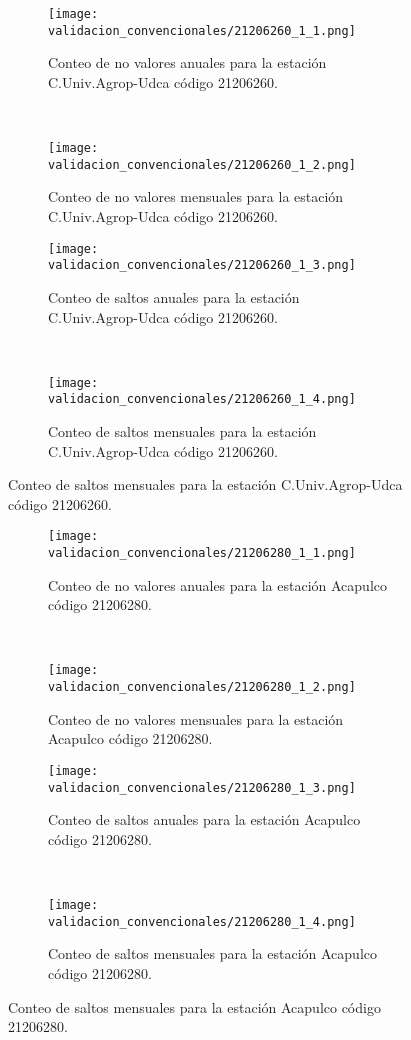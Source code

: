 \begin{figure}[H]\ContinuedFloat
\centering
	\begin{subfigure}[normla]{0.4\textwidth}
	\texttt{[image: validacion\_convencionales/21206260\_1\_1.png]}
		\caption{Conteo de no valores anuales para la estación C.Univ.Agrop-Udca código 21206260.}
		\label{subfig:a1}
		\end{subfigure}
		~
    \begin{subfigure}[normla]{0.4\textwidth}
	\texttt{[image: validacion\_convencionales/21206260\_1\_2.png]}
		\caption{Conteo de no valores mensuales para la estación C.Univ.Agrop-Udca código 21206260.}
		\label{subfig:a2}
		\end{subfigure}
		
    \begin{subfigure}[normla]{0.4\textwidth}
	\texttt{[image: validacion\_convencionales/21206260\_1\_3.png]}
		\caption{Conteo de saltos anuales para la estación C.Univ.Agrop-Udca código 21206260.}
		\label{subfig:a1}
		\end{subfigure}
		~
    \begin{subfigure}[normla]{0.4\textwidth}
	\texttt{[image: validacion\_convencionales/21206260\_1\_4.png]}
		\caption{Conteo de saltos mensuales para la estación C.Univ.Agrop-Udca código 21206260.}
		\label{subfig:a2}
		\end{subfigure}

	
\end{figure}
           
\begin{figure}[H]\ContinuedFloat
\centering
	\begin{subfigure}[normla]{0.4\textwidth}
	\texttt{[image: validacion\_convencionales/21206280\_1\_1.png]}
		\caption{Conteo de no valores anuales para la estación Acapulco código 21206280.}
		\label{subfig:a1}
		\end{subfigure}
		~
    \begin{subfigure}[normla]{0.4\textwidth}
	\texttt{[image: validacion\_convencionales/21206280\_1\_2.png]}
		\caption{Conteo de no valores mensuales para la estación Acapulco código 21206280.}
		\label{subfig:a2}
		\end{subfigure}
		
    \begin{subfigure}[normla]{0.4\textwidth}
	\texttt{[image: validacion\_convencionales/21206280\_1\_3.png]}
		\caption{Conteo de saltos anuales para la estación Acapulco código 21206280.}
		\label{subfig:a1}
		\end{subfigure}
		~
    \begin{subfigure}[normla]{0.4\textwidth}
	\texttt{[image: validacion\_convencionales/21206280\_1\_4.png]}
		\caption{Conteo de saltos mensuales para la estación Acapulco código 21206280.}
		\label{subfig:a2}
		\end{subfigure}

	
\end{figure}
           
